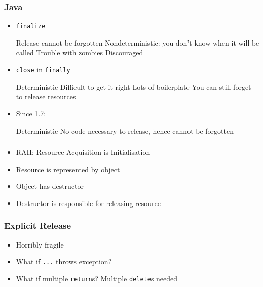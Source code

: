 \begin{frame}
  \frametitle{Java}
  \begin{itemize}
    \item {\tt finalize}
          \begin{procontralist}
            \pro Release cannot be forgotten
            \con Nondeterministic: you don't know when it will be called
            \con Trouble with zombies
            \con Discouraged
          \end{procontralist}
    \item {\tt close} in {\tt finally}
          \begin{procontralist}
            \pro Deterministic
            \con Difficult to get it right
            \con Lots of boilerplate
            \con You can still forget to release resources
          \end{procontralist}
    \item Since 1.7: 
          \begin{procontralist}
            \pro Deterministic
            \pro No code necessary to release, hence cannot be forgotten
          \end{procontralist}
  \end{itemize}
\end{frame}

\begin{frame}
  \frametitle{\cpp}
  \begin{itemize}
    \item RAII: Resource Acquisition is Initialisation
    \item Resource is represented by object
    \item Object has destructor
    \item Destructor is responsible for releasing resource
  \end{itemize}
\end{frame}

\begin{frame}
  \frametitle{Explicit Release}
  \begin{itemize}
    \item Horribly fragile
    \item What if {\tt ...} throws exception?
    \item What if multiple {\tt return}s? Multiple {\tt delete}s needed
  \end{itemize}
\end{frame}

